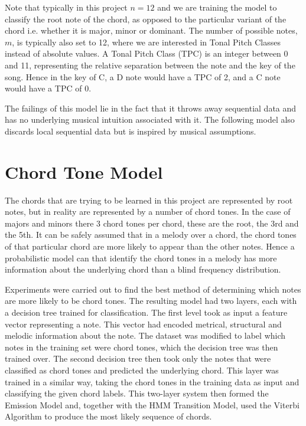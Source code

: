 \documentclass[bsc,singlespacing,logo, parskip, deptreport]{infthesis}
\begin{document}
Note that typically in this project $n = 12$ and we are training the model to classify the root note of the chord, as opposed to the particular variant of the chord i.e. whether it is major, minor or dominant. The number of possible notes, $m$, is typically also set to 12, where we are interested in Tonal Pitch Classes instead of absolute values. A Tonal Pitch Class (TPC) is an integer between 0 and 11, representing the relative separation between the note and the key of the song. Hence in the key of C, a D note would have a TPC of 2, and a C note would have a TPC of 0.

The failings of this model lie in the fact that it throws away sequential data and has no underlying musical intuition associated with it. The following model also discards local sequential data but is inspired by musical assumptions.

\section{Chord Tone Model}

The chords that are trying to be learned in this project are represented by root notes, but in reality are represented by a number of chord tones. In the case of majors and minors there 3 chord tones per chord, these are the root, the 3rd and the 5th. It can be safely assumed that in a melody over a chord, the chord tones of that particular chord are more likely to appear than the other notes. Hence a probabilistic model can that identify the chord tones in a melody has more information about the underlying chord than a blind frequency distribution.

Experiments were carried out to find the best method of determining which notes are more likely to be chord tones. The resulting model had two layers, each with a decision tree trained for classification. The first level took as input a feature vector representing a note. This vector had encoded metrical, structural and melodic information about the note. The dataset was modified to label which notes in the training set were chord tones, which the decision tree was then trained over. The second decision tree then took only the notes that were classified as chord tones and predicted the underlying chord. This layer was trained in a similar way, taking the chord tones in the training data as input and classifying the given chord labels. This two-layer system then formed the Emission Model and, together with the HMM Transition Model, used the Viterbi Algorithm to produce the most likely sequence of chords.
\end{document}
